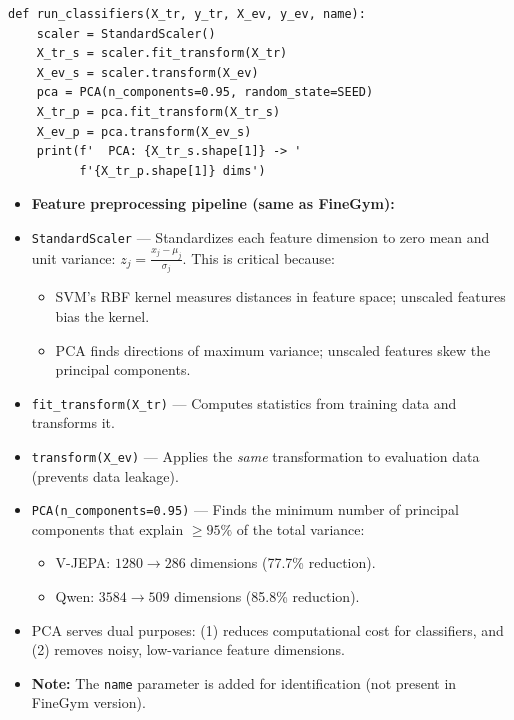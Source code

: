 \begin{lstlisting}
def run_classifiers(X_tr, y_tr, X_ev, y_ev, name):
    scaler = StandardScaler()
    X_tr_s = scaler.fit_transform(X_tr)
    X_ev_s = scaler.transform(X_ev)
    pca = PCA(n_components=0.95, random_state=SEED)
    X_tr_p = pca.fit_transform(X_tr_s)
    X_ev_p = pca.transform(X_ev_s)
    print(f'  PCA: {X_tr_s.shape[1]} -> '
          f'{X_tr_p.shape[1]} dims')
\end{lstlisting}

\begin{explanation}
\begin{itemize}[nosep]
  \item \textbf{Feature preprocessing pipeline (same as FineGym):}
  \item \texttt{StandardScaler} --- Standardizes each feature dimension to zero mean and unit variance: $z_j = \frac{x_j - \mu_j}{\sigma_j}$. This is critical because:
  \begin{itemize}[nosep]
    \item SVM's RBF kernel measures distances in feature space; unscaled features bias the kernel.
    \item PCA finds directions of maximum variance; unscaled features skew the principal components.
  \end{itemize}
  \item \texttt{fit\_transform(X\_tr)} --- Computes statistics from training data and transforms it.
  \item \texttt{transform(X\_ev)} --- Applies the \textit{same} transformation to evaluation data (prevents data leakage).
  \item \texttt{PCA(n\_components=0.95)} --- Finds the minimum number of principal components that explain $\geq 95\%$ of the total variance:
  \begin{itemize}[nosep]
    \item V-JEPA: $1280 \to 286$ dimensions (77.7\% reduction).
    \item Qwen: $3584 \to 509$ dimensions (85.8\% reduction).
  \end{itemize}
  \item PCA serves dual purposes: (1) reduces computational cost for classifiers, and (2) removes noisy, low-variance feature dimensions.
  \item \textbf{Note:} The \texttt{name} parameter is added for identification (not present in FineGym version).
\end{itemize}
\end{explanation}

